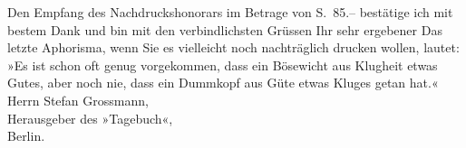 \begin{ledgroupsized}[t]{13cm}
           Den Empfang des Nachdruckshonorars im Betrage von S. 85.– bestätige ich mit
                    bestem Dank und bin mit den verbindlichsten Grüssen\pend
           \pstart Ihr sehr ergebener\pend{}{\bigskip}\pstart
           \noindent{}Das letzte Aphorisma, wenn Sie es vielleicht noch nachträglich drucken
                        wollen, lautet:\pend
           \pstart
           »Es ist schon oft genug vorgekommen, dass ein Bösewicht aus Klugheit etwas
                        Gutes, aber noch nie, dass ein Dummkopf aus Güte etwas Kluges getan
                        hat.«\pend
           {\bigskip}\pstart
           \noindent{}Herrn Stefan Grossmann,{\\}Herausgeber des »Tagebuch«,{\\}Berlin.\pend
           \endnumbering{}\end{ledgroupsized}  \newcommand{\dateiname}{L02476}\newcommand{\titel}{Arthur Schnitzler an Stefan Großmann, 31. 5. 1926}\newcommand{\editorInnen}{Martin Anton Müller und Gerd-Hermann Susen}
            \footnotesize
\begin{ledgroupsized}[t]{11.5cm}
\end{ledgroupsized}
         
      
